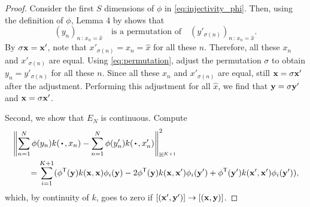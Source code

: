 \documentclass[12pt, twoside]{report}
\begin{document}
\begin{proof}
    Consider the first $S$ dimensions of $\phi$ in \eqref{eq:injectivity_phi}.
    Then, using the definition of $\phi$, Lemma 4 by \textcite{Zaheer:2017:Deep_Sets} shows that
    \begin{equation} \label{eq:permutation}
        (y_n)_{n\,:\,x_n = \hat x}
        \quad\text{is a permutation of}\quad
        (y'_{\sigma(n)})_{n\,:\,x_n = \hat x}.
    \end{equation}
    By $\sigma \mathbf{x} = \mathbf{x}'$, note that $x'_{\sigma(n)} = x_n = \hat x$ for all these $n$.
    Therefore, all these $x_n$ and $x'_{\sigma(n)}$ are equal.
    Using \eqref{eq:permutation},
    adjust the permutation $\sigma$ to obtain $y_n = y'_{\sigma(n)}$ for all these $n$.
    Since all these $x_n$ and $x'_{\sigma(n)}$ are equal,
    still $\mathbf{x} = \sigma \mathbf{x}'$ after the adjustment.
    Performing this adjustment for all $\hat x$, we find that $\mathbf{y} = \sigma \mathbf{y}'$ and $\mathbf{x} = \sigma \mathbf{x}'$.
    
    Second, we show that $E_N$ is continuous.
    Compute 
    \begin{align}
        &\left\|
            \sum_{n=1}^N \phi(y_n) k(\vardot, x_n)
            - \sum_{n=1}^{N} \phi(y'_n) k(\vardot, x'_n)
        \right\|^2_{\Hb^{K+1}}
        \\ & \qquad =
            \sum_{i=1}^{K+1} \parens{
                \phi^\T(\vy) k(\vx, \vx) \phi_i(\vy)
                - 2 \phi^\T(\vy) k(\vx, \vx') \phi_i(\vy')
                + \phi^\T(\vy') k(\vx', \vx') \phi_i(\vy')
            }, \nonumber
    \end{align}
    which, by continuity of $k$, goes to zero if $[(\mathbf{x}', \mathbf{y}')] \to [(\mathbf{x}, \mathbf{y})]$.
\end{proof}
\end{document}
